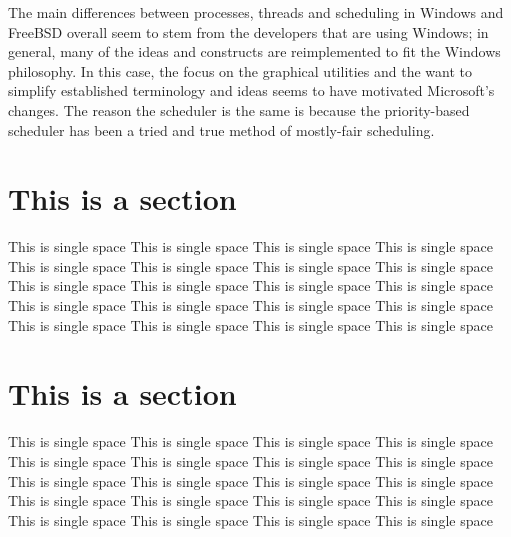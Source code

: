 \documentclass[titlepage]{article}
\begin{document}
\begin{singlespace}
    The main differences between processes, threads and scheduling in Windows and FreeBSD overall seem to stem from the developers that are using Windows; in general, many of the ideas and constructs are reimplemented to fit the Windows philosophy. In this case, the focus on the graphical utilities and the want to simplify established terminology and ideas seems to have motivated Microsoft's changes. The reason the scheduler is the same is because the priority-based scheduler has been a tried and true method of mostly-fair scheduling.\\

 
\end{singlespace}

\section{This is a section}
\begin{singlespace}
This is single space This is single space This is single space This is single space This is single space This is single space This is single space This is single space  This is single space This is single space This is single space This is single space  This is single space This is single space This is single space This is single space  This is single space This is single space This is single space This is single space  
\end{singlespace}

\section{This is a section}
\begin{singlespace}
This is single space This is single space This is single space This is single space This is single space This is single space This is single space This is single space  This is single space This is single space This is single space This is single space  This is single space This is single space This is single space This is single space  This is single space This is single space This is single space This is single space  
\end{singlespace}

\newpage


\end{document}
